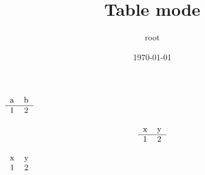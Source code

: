 \documentclass[11pt]{article}
\author{root}
\date{\today}
\title{Table mode}
\begin{document}
\maketitle
\(\begin{tabular}{cc}
 a & b \\[0pt]
\hline 1 & 2 \\[0pt]
\end{tabular}
\)

\[
\begin{tabular}{cc}
 x & y \\[0pt]
\hline 1 & 2 \\[0pt]
\end{tabular}
\]

\(\begin{tabular}{cc}
 x & y \\[0pt]
 1 & 2 \\[0pt]
\end{tabular}
\)
\end{document}
